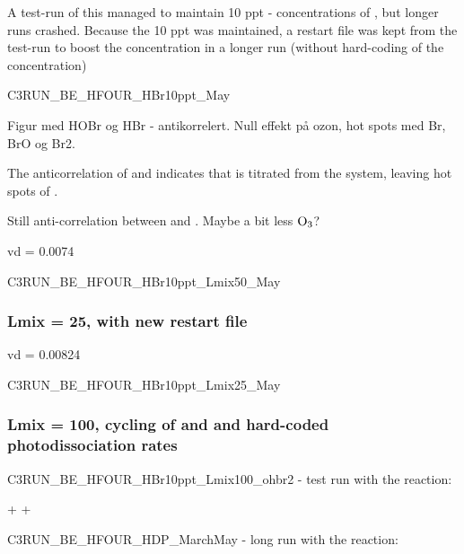 A test-run of this managed to maintain 10 ppt - concentrations of , but longer runs crashed. Because the 10 ppt was maintained, a restart file was kept from the test-run to boost the concentration in a longer run (without hard-coding of the  concentration)



C3RUN\_BE\_HFOUR\_HBr10ppt\_May

Figur med HOBr og HBr - antikorrelert. Null effekt på ozon, hot spots med Br, BrO og Br2. 

The anticorrelation of  and  indicates that  is titrated from the system, leaving hot spots of . 


Still anti-correlation between  and . Maybe a bit less $\mathrm{O_3}$? 

vd = 0.0074 

C3RUN\_BE\_HFOUR\_HBr10ppt\_Lmix50\_May

\subsubsection{Lmix = 25, with new restart file}

vd = 0.00824

C3RUN\_BE\_HFOUR\_HBr10ppt\_Lmix25\_May


\subsubsection{Lmix = 100, cycling of  and  and hard-coded photodissociation rates}

C3RUN\_BE\_HFOUR\_HBr10ppt\_Lmix100\_ohbr2 - test run with the reaction: 

\begin{reaction}
     +  \rightarrow {} + 
    \label{rqn:oh_br2}
\end{reaction}

C3RUN\_BE\_HFOUR\_HDP\_MarchMay - long run with the reaction: 

